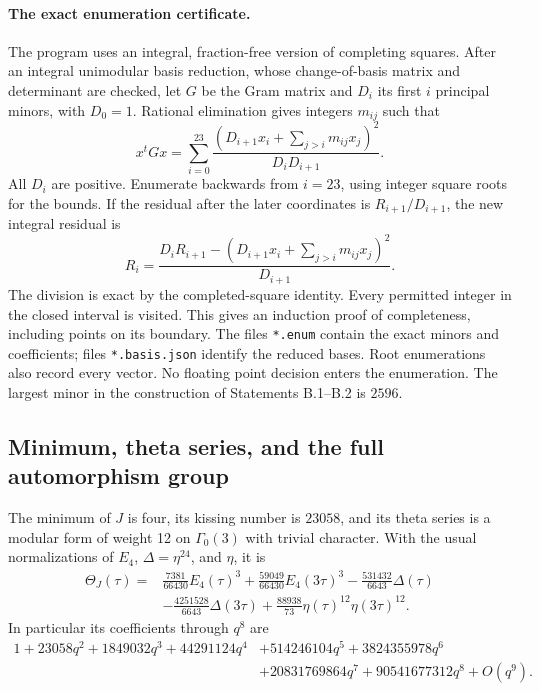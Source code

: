 \paragraph{The exact enumeration certificate.}
The program  uses an integral,
fraction-free version of completing squares. After an integral
unimodular basis reduction, whose change-of-basis matrix and determinant
are checked, let \(G\) be the Gram matrix and \(D_i\) its first \(i\)
principal minors, with \(D_0=1\). Rational elimination gives integers
\(m_{ij}\) such that
\[
 x^tGx=\sum_{i=0}^{23}
 \frac{(D_{i+1}x_i+\sum_{j>i}m_{ij}x_j)^2}{D_iD_{i+1}}.
\]
All \(D_i\) are positive. Enumerate backwards from \(i=23\), using
integer square roots for the bounds. If the residual after the later
coordinates is \(R_{i+1}/D_{i+1}\), the new integral residual is
\[
 R_i=\frac{D_iR_{i+1}-(D_{i+1}x_i+\sum_{j>i}m_{ij}x_j)^2}{D_{i+1}}.
\]
The division is exact by the completed-square identity. Every permitted
integer in the closed interval is visited. This gives an induction
proof of completeness, including points on its boundary. The files
\texttt{*.enum} contain the exact minors and coefficients; files
\texttt{*.basis.json} identify the reduced bases. Root enumerations
also record every vector. No floating point decision enters the
enumeration. The largest minor in the construction of Statements
B.1--B.2 is \(2596\).

\subsection{Minimum, theta series, and the full automorphism group}

\begin{statement}
The minimum of \(J\) is four, its kissing number is \(23058\), and
its theta series is a modular form of weight 12 on \(\Gamma_0(3)\)
with trivial character. With the usual normalizations of \(E_4\),
\(\Delta=\eta^{24}\), and \(\eta\), it is
\begin{equation}\label{eq:B-theta}
\begin{split}
 \Theta_J(\tau)={}&\frac{7381}{66430}E_4(\tau)^3
 +\frac{59049}{66430}E_4(3\tau)^3
 -\frac{531432}{6643}\Delta(\tau)\\
 &-\frac{4251528}{6643}\Delta(3\tau)
 +\frac{88938}{73}\eta(\tau)^{12}\eta(3\tau)^{12}.
\end{split}
\end{equation}
In particular its coefficients through \(q^8\) are
\begin{align*}
 1+23058q^2+1849032q^3+44291124q^4
 &+514246104q^5+3824355978q^6\\
 &+20831769864q^7+90541677312q^8+O(q^9).
\end{align*}
\end{statement}

